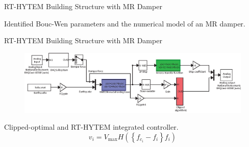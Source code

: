 \documentclass[usepdftitle=false]{beamer}
\begin{document}
\begin{frame}{RT-HYTEM Building Structure with MR Damper}
\begin{figure}[H]
\centering
\setcounter{subfigure}{0}
\label{fig:8-13}
\end{figure}
Identified Bouc-Wen parameters and the numerical model of an MR damper.
\end{frame}



\begin{frame}{RT-HYTEM Building Structure with MR Damper}
\begin{figure}[H]
\centering
\includegraphics[width=1\textwidth] {figure/8-14.eps}
\label{fig:8-14}
\end{figure}
Clipped-optimal and RT-HYTEM integrated controller.
\begin{equation}\label{eq:8-21}
v_{i} = V_{\text{max}}H\left(\left\{f_{c_{i}}-f_{i}\right\}f_{i}\right)
\end{equation}
\end{frame}
\end{document}

